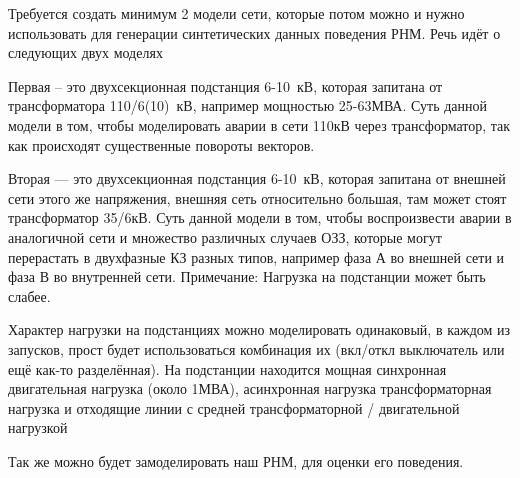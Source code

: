 Требуется создать минимум 2 модели сети, которые потом можно и нужно использовать для генерации синтетических данных поведения РНМ. Речь идёт о следующих двух моделях\par\vspace{0.3cm}

Первая – это двухсекционная подстанция 6-10~кВ, которая запитана от трансформатора 110/6(10)~кВ, например мощностью 25-63МВА. Суть данной модели в том, чтобы моделировать аварии в сети 110кВ через трансформатор, так как происходят существенные повороты векторов.\par\vspace{0.3cm}

Вторая — это двухсекционная подстанция 6-10~кВ, которая запитана от внешней сети этого же напряжения, внешняя сеть относительно большая, там может стоят трансформатор 35/6кВ. Суть данной модели в том, чтобы воспроизвести аварии в аналогичной сети и множество различных случаев ОЗЗ, которые могут перерастать в двухфазные КЗ разных типов, например фаза А во внешней сети и фаза В во внутренней сети. Примечание: Нагрузка на подстанции может быть слабее.\par\vspace{0.3cm}

Характер нагрузки на подстанциях можно моделировать одинаковый, в каждом из запусков, прост будет использоваться комбинация их (вкл/откл выключатель или ещё как-то разделённая). На подстанции находится мощная синхронная двигательная нагрузка (около 1МВА), асинхронная нагрузка трансформаторная нагрузка и отходящие линии с средней трансформаторной / двигательной нагрузкой\par\vspace{0.3cm}

Так же можно будет замоделировать наш РНМ, для оценки его поведения.\par\vspace{0.3cm}

\par\vspace{0.2cm}
